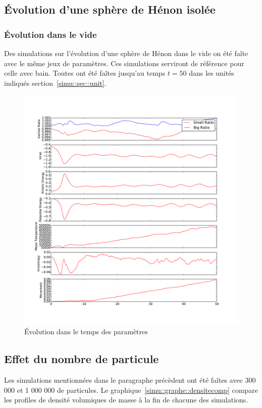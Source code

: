 \subsection{Évolution d'une sphère de Hénon isolée}
	\subsubsection{Évolution dans le vide}
		Des simulations sur l'évolution d'une sphère de Hénon dans le vide on été faîte avec le même
		jeux de paramètres. Ces simulations serviront de référence pour celle avec bain. Toutes ont
		été faîtes jusqu'au temps $t = 50$ dans les unités indiqués section~\ref{simu::sec::unit}.

		\begin{figure}
			\begin{center}
				\includegraphics[width=\textwidth]{graphe/All_parameters.pdf}
				\caption{Évolution dans le temps des paramètres}
				\label{simu::graphe::Parameter}
			\end{center}
		\end{figure}

	\subsection{Effet du nombre de particule}
		Les simulations mentionnées dans le paragraphe précèdent ont été faîtes avec 300 000 et 1 000 000
		de particules. Le graphique~\ref{simu::graphe::densitecomp} compare les profiles de densité volumiques de masse
		à la fin de chacune des simulations.

